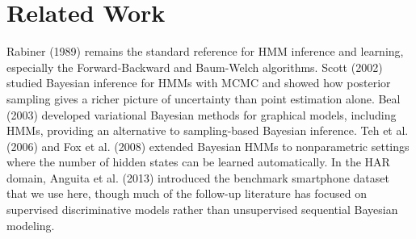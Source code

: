 \section{Related Work}
Rabiner (1989) remains the standard reference for HMM inference and learning, especially the Forward-Backward and Baum-Welch algorithms. Scott (2002) studied Bayesian inference for HMMs with MCMC and showed how posterior sampling gives a richer picture of uncertainty than point estimation alone. Beal (2003) developed variational Bayesian methods for graphical models, including HMMs, providing an alternative to sampling-based Bayesian inference. Teh et al. (2006) and Fox et al. (2008) extended Bayesian HMMs to nonparametric settings where the number of hidden states can be learned automatically. In the HAR domain, Anguita et al. (2013) introduced the benchmark smartphone dataset that we use here, though much of the follow-up literature has focused on supervised discriminative models rather than unsupervised sequential Bayesian modeling.
